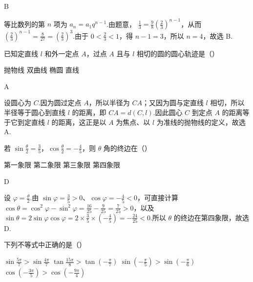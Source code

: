 \begin{answer}
B
\end{answer}

\begin{solution}
等比数列的第 \(n\) 项为 \(a_n=a_1q^{n-1}\).由题意，
\(\frac{1}{3}=\frac{9}{8}\left(\frac{2}{3}\right)^{n-1}\)，从而
\(\left(\frac{2}{3}\right)^{n-1}=\frac{8}{27}=\left(\frac{2}{3}\right)^3\).由于 \(0<\frac{2}{3}<1\)，得 \(n-1=3\)，所以 \(n=4\)，故选 B.
\end{solution}

\begin{problem}

已知定直线 \(l\) 和外一定点 \(A\)，过点 \(A\) 且与 \(l\) 相切的圆的圆心轨迹是（\quad）

\choices
    {抛物线}
    {双曲线}
    {椭圆}
    {直线}
\end{problem}

\begin{answer}
A
\end{answer}

\begin{solution}
设圆心为 \(C\).因为圆过定点 \(A\)，所以半径为 \(CA\)；又因为圆与定直线 \(l\) 相切，所以半径等于圆心到直线 \(l\) 的距离，即
\(CA=d(C,l)\).因此圆心 \(C\) 到定点 \(A\) 的距离等于它到定直线 \(l\) 的距离，这正是以 \(A\) 为焦点、以 \(l\) 为准线的抛物线的定义，故选 A.
\end{solution}

\begin{problem}

若 \(\sin \frac{\theta}{2}=\frac{3}{5}\)，\(\cos \frac{\theta}{2}=-\frac{4}{5}\)，则 \(\theta\) 角的终边在（\quad）

\choices
    {第一象限}
    {第二象限}
    {第三象限}
    {第四象限}
\end{problem}

\begin{answer}
D
\end{answer}

\begin{solution}
设 \(\varphi=\frac{\theta}{2}\).由 \(\sin\varphi=\frac{3}{5}>0\)、\(\cos\varphi=-\frac{4}{5}<0\)，可直接计算
\(\cos\theta=\cos^2\varphi-\sin^2\varphi=\frac{16}{25}-\frac{9}{25}=\frac{7}{25}>0\)，以及
\(\sin\theta=2\sin\varphi\cos\varphi=2\times\frac{3}{5}\times\left(-\frac{4}{5}\right)=-\frac{24}{25}<0\).所以 \(\theta\) 的终边在第四象限，故选 D.
\end{solution}

\begin{problem}

下列不等式中正确的是（\quad）

\choices
    {\(\sin \frac{5\pi}{7}>\sin \frac{4\pi}{7}\)}
    {\(\tan\frac{15\pi}{8}>\tan\left( -\frac{\pi}{7} \right)\)}
    {\(\sin \left( -\frac{\pi}{5} \right)>\sin \left( -\frac{\pi}{6} \right)\)}
    {\(\cos \left( -\frac{3\pi}{5} \right)>\cos \left( -\frac{9\pi}{4} \right)\)}
\end{problem}

